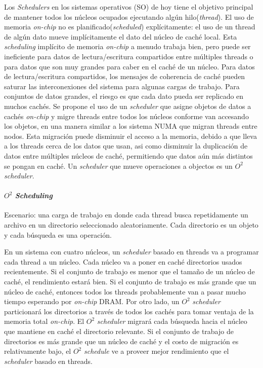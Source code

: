 Los \emph{Schedulers} en los sistemas operativos (SO) de hoy tiene el objetivo principal de mantener todos los núcleos ocupados ejecutando algún hilo(\emph{thread}). El uso de memoria \emph{on-chip} no es planificado(\emph{scheduled}) explícitamente: el uso de un thread de algún dato mueve implícitamente el dato del núcleo de caché local. Esta \emph{scheduling} implícito de memoria \emph{on-chip} a menudo trabaja bien, pero puede ser ineficiente para datos de lectura/escritura compartidos entre múltiples threads o para datos que son muy grandes para caber en el caché de un núcleo. Para datos de lectura/escritura compartidos, los mensajes de coherencia de caché pueden saturar las interconexiones del sistema para algunas cargas de trabajo. Para conjuntos de datos grandes, el riesgo es que cada dato pueda ser replicado en muchos cachés. Se propone el uso de un \emph{scheduler} que asigne objetos de datos a cachés \emph{on-chip} y migre threads entre todos los núcleos conforme van accesando los objetos, en una manera similar a los sistema NUMA que migran threads entre nodos. Esta migración puede disminuir el acceso a la memoria, debido a que lleva a los threads cerca de los datos que usan, asi como disminuir la duplicación de datos entre múltiples núcleos de caché, permitiendo que datos aún más distintos se pongan en caché. Un \emph{scheduler} que mueve operaciones a objectos es un $O^2$ \emph{scheduler}.

\paragraph{\textnormal{\textbf{$O^2$ \emph{Scheduling}}}}
Escenario: una carga de trabajo en donde cada thread busca repetidamente un archivo en un directorio seleccionado aleatoriamente. Cada directorio es un objeto y cada búsqueda es una operación.

En un sistema con cuatro núcleos, un \emph{scheduler} basado en threads va a programar cada thread a un núcleo. Cada núcleo va a poner en caché directorios usados recientemente. Si el conjunto de trabajo es menor que el tamaño de un núcleo de caché, el rendimiento estará bien. Si el conjunto de trabajo es más grande que un núcleo de caché, entonces todos los threads probablemente van a pasar mucho tiempo esperando por \emph{on-chip} DRAM. Por otro lado, un $O^2$ \emph{scheduler} particionará los directorios a través de todos los cachés para tomar ventaja de la memoria total \emph{on-chip}. El $O^2$ \emph{scheduler} migrará cada búsqueda hacia el núcleo que mantiene en caché el directorio relevante. Si el conjunto de trabajo de directorios es más grande que un núcleo de caché y el costo de migración es relativamente bajo, el $O^2$ \emph{schedule} ve a proveer mejor rendimiento que el \emph{scheduler} basado en threads.

